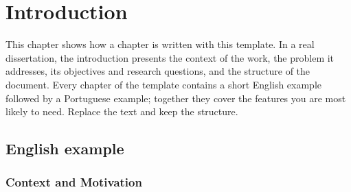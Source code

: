 
\chapter{Introduction}
\label{chap:introduction}

This chapter shows how a chapter is written with this template. In a real
dissertation, the introduction presents the context of the work, the problem
it addresses, its objectives and research questions, and the structure of the
document. Every chapter of the template contains a short English example
followed by a Portuguese example; together they cover the features you are
most likely to need. Replace the text and keep the structure.

\section{English example}
\label{sec:intro:en}

\subsection{Context and Motivation}
\label{sec:intro:context}

